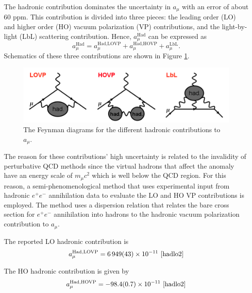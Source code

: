 \documentclass{outhesis}
\begin{document}
The hadronic contribution dominates the uncertainty in $a_{\mu}$ with an error of about 60 ppm. %
This contribution is divided into three pieces: the leading order (LO) and higher order (HO) vacuum polarization (VP) contributions, and the light-by-light (LbL) scattering contribution. Hence, $a_{\mu}^{\text{Had}}$ can be expressed as
\begin{equation}
a_{\mu}^{\text{Had}} = a_{\mu}^{\text{Had,LOVP}}+a_{\mu}^{\text{Had,HOVP}} + a_{\mu}^{\text{LbL}}.
\end{equation}
Schematics of these three contributions are shown in Figure \ref{fig:had}.
\begin{figure}
  \centering
  \includegraphics[scale=0.5]{figures/had}
   \caption{The Feynman diagrams for the different hadronic contributions to $a_{\mu}$. }
  \label{fig:had}
\end{figure}

The reason for these contributions' high uncertainty is related to the invalidity of perturbative QCD methods since the virtual hadrons that affect the anomaly have an energy scale of $m_{\mu}c^2$ which is well below the QCD region. %
For this reason, a semi-phenomenological method that uses experimental input from hadronic $e^+e^-$ annihilation data to evaluate the LO and HO VP contributions is employed. The method uses a dispersion relation that relates the bare cross section for $e^+e^-$ annihilation into hadrons to the hadronic vacuum polarization contribution to $a_{\mu}$. %

The reported LO hadronic contribution is %
\begin{equation}
a_{\mu}^{\text{Had,LOVP}} = 6\,949(43) \times 10^{-11} \,\,\cite{hadlo2} 
\label{eq:hadlo2}
\end{equation}

The HO hadronic contribution is given by 
\begin{equation}
a_{\mu}^{\text{Had,HOVP}} = -98.4(0.7) \times 10^{-11} \,\,\cite{hadlo2} 
\label{eq:hadho}
\end{equation}
\end{document}

